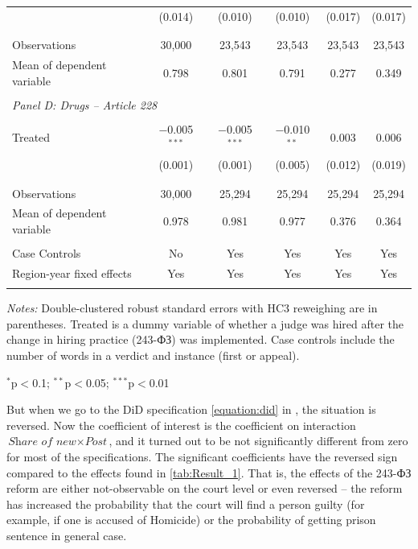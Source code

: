 \documentclass[12pt]{article}
\numberwithin{equation}{section}
\numberwithin{table}{section}
\numberwithin{figure}{section}
\begin{document}
\begin{table}[!htbp]
\begin{threeparttable}
\begin{tabular}{@{\extracolsep{5pt}}lccccc}
& (0.014) & (0.010) & (0.010) & (0.017) & (0.017) \\ 
& & & & & \\[-1.8ex] 
\hline \\[-1.8ex] 
Observations & 30,000 & 23,543 & 23,543 & 23,543 & 23,543 \\ 
Mean of dependent variable &0.798 &0.801 &0.791 &0.277& 0.349\\ 
\hline \\[-1.8ex] 
\multicolumn{6}{l}{\textit{Panel D: Drugs -- Article 228}}\\[-1.8ex] \\
Treated &$-$0.005$^{***}$ & $-$0.005$^{***}$ & $-$0.010$^{**}$ & 0.003 & 0.006 \\
& (0.001)  & (0.001) & (0.005) & (0.012) & (0.019) \\ 
& & & & & \\[-1.8ex] 
\hline \\[-1.8ex] 
Observations &30,000 & 25,294 & 25,294 & 25,294 & 25,294\\ 
Mean of dependent variable &0.978 &0.981& 0.977 &0.376& 0.364\\ \hline\\[-1.8ex] 
Case Controls &No &Yes &Yes&Yes&Yes\\ 
Region-year fixed effects &Yes &Yes&Yes&Yes& Yes \\ \\[-1.8ex]  
\hline 
\hline 
  \end{tabular} 
  \begin{tablenotes}[flushleft]
    \item[]\textit{Notes:} Double-clustered robust standard errors \citet{Thompson2011,Cameron2011} with HC3 reweighing are in parentheses. Treated is a dummy variable of whether a judge was hired after the change in hiring practice (243-ФЗ) was implemented. Case controls include the number of words in a verdict and instance (first or appeal).
    \item[] $^{*}$p$<$0.1; $^{**}$p$<$0.05; $^{***}$p$<$0.01
  \end{tablenotes}
        
\end{threeparttable}
  \end{table} 

  But when we go to the DiD specification \vref{equation:did} in , the situation is reversed. 
  Now the coefficient of interest is the coefficient on interaction $\textit{Share of new}\times \textit{Post}$, and it turned out to be not significantly different from zero for most of the specifications. 
  The significant coefficients have the reversed sign compared to the effects found in \vref{tab:Result_1}. 
  That is, the effects of the 243-ФЗ reform are either not-observable on the court level or even reversed -- the reform has increased the probability that the court will find a person guilty (for example, if one is accused of Homicide)  or the probability of getting prison sentence in general case.
\end{document}
